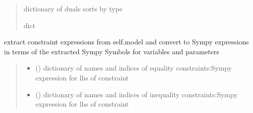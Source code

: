 \documentclass[letterpaper,10pt,english]{sphinxmanual}
\begin{document}
\begin{fulllineitems}
\begin{fulllineitems}
\begin{quote}
\begin{description}
\begin{itemize}
\end{itemize}

\sphinxAtStartPar
dictionary of duals sorts by type

\sphinxAtStartPar
dict

\end{description}\end{quote}

\end{fulllineitems}


\begin{fulllineitems}
\label{\detokenize{src.sensitivity.sensitivity_tools:src.sensitivity.sensitivity_tools.AutoSympy.get_constraints}}
\pysigstartsignatures
\pysiglinewithargsret
{}
{}
{}
\pysigstopsignatures
\sphinxAtStartPar
extract constraint expressions from self.model and convert to Sympy expressions
in terms of the extracted Sympy Symbols for variables and parameters
\begin{quote}\begin{description}
\sphinxAtStartPar
\begin{itemize}
\item {} 
\sphinxAtStartPar
{} () \textendash{} dictionary of names and indices of equality constraints:Sympy expression for lhs of constraint

\item {} 
\sphinxAtStartPar
{} () \textendash{} dictionary of names and indices of inequality constraints:Sympy expression for lhs of constraint

\end{itemize}


\end{description}\end{quote}

\end{fulllineitems}



\end{fulllineitems}
\end{document}
